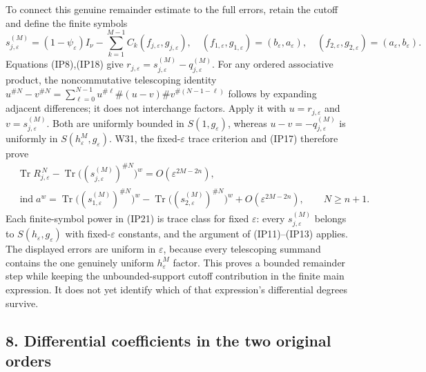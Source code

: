 \documentclass[
  11pt,
]{article}
\begin{document}
To connect this genuine remainder estimate to the full errors, retain
the cutoff and define the finite symbols \[
 s_{j,\varepsilon}^{(M)}
 =(1-\psi_\varepsilon)I_\nu
     -\sum_{k=1}^{M-1}C_k(f_{j,\varepsilon},g_{j,\varepsilon}),
 \quad
 (f_{1,\varepsilon},g_{1,\varepsilon})=(b_\varepsilon,a_\varepsilon),
 \quad
 (f_{2,\varepsilon},g_{2,\varepsilon})=(a_\varepsilon,b_\varepsilon).
 \tag{IP20}
\] Equations (IP8),(IP18) give \(r_{j,\varepsilon}
=s_{j,\varepsilon}^{(M)}-q_{j,\varepsilon}^{(M)}\). For any ordered
associative product, the noncommutative telescoping identity
\(u^{\# N}-v^{\# N}
=\sum_{\ell=0}^{N-1}u^{\#\ell}\#(u-v)\#v^{\#(N-1-\ell)}\) follows by
expanding adjacent differences; it does not interchange factors. Apply
it with \(u=r_{j,\varepsilon}\) and \(v=s_{j,\varepsilon}^{(M)}\). Both
are uniformly bounded in \(S(1,g_\varepsilon)\), whereas
\(u-v=-q_{j,\varepsilon}^{(M)}\) is uniformly in
\(S(h_\varepsilon^M,g_\varepsilon)\). W31, the fixed-\(\varepsilon\)
trace criterion and (IP17) therefore prove \[
 \begin{split}
 &\operatorname{Tr}R_{j,\varepsilon}^{\,N}
   -\operatorname{Tr}
      \bigl((s_{j,\varepsilon}^{(M)})^{\# N}\bigr)^w
      =O(\varepsilon^{2M-2n}),\\
 &\operatorname{ind}a^w
  =\operatorname{Tr}
      \bigl((s_{1,\varepsilon}^{(M)})^{\# N}\bigr)^w
   -\operatorname{Tr}
      \bigl((s_{2,\varepsilon}^{(M)})^{\# N}\bigr)^w
      +O(\varepsilon^{2M-2n}),
 \qquad N\ge n+1 .
 \end{split}
 \tag{IP21}
\] Each finite-symbol power in (IP21) is trace class for fixed
\(\varepsilon\): every \(s_{j,\varepsilon}^{(M)}\) belongs to
\(S(h_\varepsilon,g_\varepsilon)\) with fixed-\(\varepsilon\) constants,
and the argument of (IP11)--(IP13) applies. The displayed errors are
uniform in \(\varepsilon\), because every telescoping summand contains
the one genuinely uniform \(h_\varepsilon^M\) factor. This proves a
bounded remainder step while keeping the unbounded-support cutoff
contribution in the finite main expression. It does not yet identify
which of that expression's differential degrees survive.

\subsection{8. Differential coefficients in the two original
orders}\label{differential-coefficients-in-the-two-original-orders}
\end{document}
